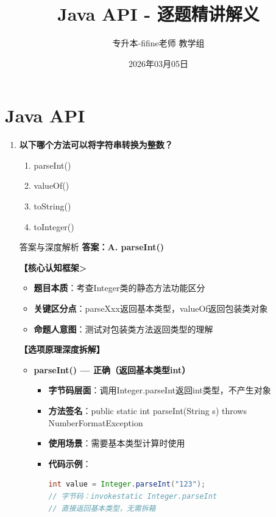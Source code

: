 \documentclass[12pt, a4paper]{ctexart}
\title{\textcolor{myblue}{\textbf{Java API - 逐题精讲解义}}}
\author{专升本-fifine老师 教学组}
\date{2026年03月05日}
\begin{document}
\maketitle
\thispagestyle{empty}
\newpage

\section{Java API}

\begin{enumerate}[label=\textbf{\arabic*.}]

	\item \textbf{以下哪个方法可以将字符串转换为整数？}
	      \begin{enumerate}[label=\Alph*.]
		      \item parseInt()
		      \item valueOf()
		      \item toString()
		      \item toInteger()
	      \end{enumerate}

	      \begin{bluebox}{答案与深度解析}
		      \textbf{答案：A. parseInt()}

		      \textbf{【核心认知框架>}
		      \begin{itemize}[label={}, leftmargin=*, nosep]
			      \item \textbf{题目本质}：考查Integer类的静态方法功能区分
			      \item \textbf{关键区分点}：parseXxx返回基本类型，valueOf返回包装类对象
			      \item \textbf{命题人意图}：测试对包装类方法返回类型的理解
		      \end{itemize}

		      \textbf{【选项原理深度拆解】}

		      \begin{itemize}[leftmargin=*, nosep, label={}]
			      \item[A] \textbf{parseInt() — 正确（返回基本类型int）}
			            \begin{itemize}[label={}, leftmargin=*, nosep]
				            \item \textbf{字节码层面}：调用Integer.parseInt返回int类型，不产生对象
				            \item \textbf{方法签名}：public static int parseInt(String s) throws NumberFormatException
				            \item \textbf{使用场景}：需要基本类型计算时使用
				            \item \textbf{代码示例}：
				                  \begin{lstlisting}[language=Java]
int value = Integer.parseInt("123");
// 字节码：invokestatic Integer.parseInt
// 直接返回基本类型，无需拆箱
				            \end{lstlisting}
			            \end{itemize}


\end{itemize}
\end{bluebox}
\end{enumerate}
\end{document}
